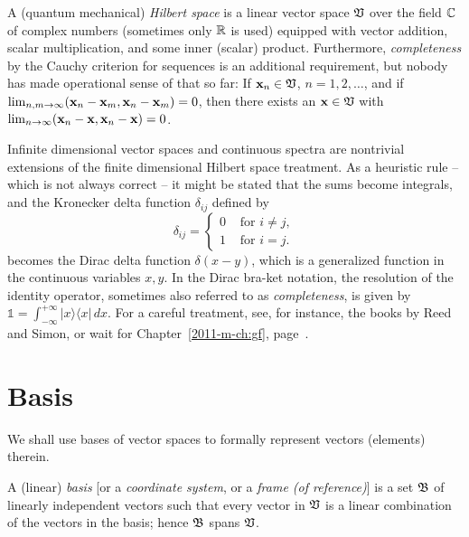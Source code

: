 A (quantum mechanical) {\em Hilbert space}  is a linear
vector space ${\frak V}$ over the field ${\Bbb C}$ of complex numbers
(sometimes only ${\Bbb R}$ is used)
equipped with vector addition, scalar multiplication, and some inner (scalar) product.
Furthermore, {\em completeness}
by the Cauchy criterion for sequences
is an additional requirement,
but nobody has made operational sense of that so far:
If ${\bf x}_n\in {\frak V}$, $n=1,2,\ldots$, and if $\lim_{n,m\rightarrow
\infty} ({\bf x}_n-{\bf x}_m,{\bf x}_n-{\bf x}_m)=0$,
then there exists an ${\bf x}\in {\frak V}$ with
$\lim_{n\rightarrow \infty} ({\bf x}_n-{\bf x},{\bf x}_n-{\bf x})=0$.





Infinite dimensional vector spaces and continuous spectra are nontrivial
extensions of the finite
dimensional Hilbert space treatment. As a heuristic rule -- which is not
always correct -- it might be
stated that the sums become integrals, and the Kronecker delta function
$\delta_{ij}$ defined by
\begin{equation}
\delta_{ij} =\begin{cases}
0  &\text{ for }i\neq j , \\
1  &\text{ for }i = j.
\end{cases}
\end{equation}
becomes the Dirac delta function $\delta (x-y)$, which is a
generalized function in the continuous variables $x,y$.
In the Dirac bra-ket notation, the resolution of the identity operator,
sometimes also referred to as {\em completeness}, is given by
$\mathbb{1} = \int_{-\infty}^{+\infty} \vert x\rangle \langle  x\vert \, dx$.
For a careful treatment, see, for instance,
the books by
Reed and Simon,\cite{reed-sim1,reed-sim2}
or wait for Chapter~\ref{2011-m-ch:gf}, page~\pageref{2011-m-ch:gf}.


\section{Basis}
\label{2012-m-ch-fdvs-Basis}

We shall use bases of vector spaces to formally represent vectors (elements) therein.

A (linear) {\em basis}
[or a {\em coordinate system}, or a {\em frame (of reference)}]
is a set    $\frak B$
of linearly independent vectors
such that every vector
in $\frak V$ is a linear combination of the vectors in the basis; hence
$\frak B$ spans $\frak V$.

